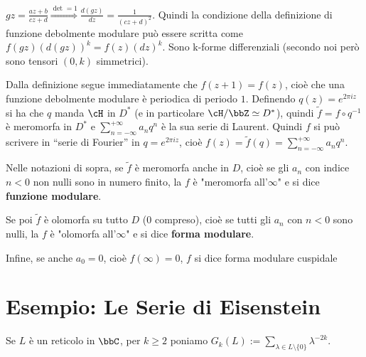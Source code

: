 \begin{osservazione}
$\displaystyle{gz=\frac{az+b}{cz+d} \stackrel{\det = 1}{\Rightarrow}
\frac{d(gz)}{dz}=\frac{1}{(cz+d)^2}}$. Quindi la condizione della definizione di
funzione debolmente modulare può essere scritta come $f(gz)(d(gz))^k=f(z)(dz)^k$.
Sono k-forme differenziali (secondo noi però sono tensori $(0, k)$ simmetrici).
\end{osservazione}

\begin{osservazione}
Dalla definizione segue immediatamente che $f(z+1)=f(z)$, cioè che una
funzione debolmente modulare è periodica di periodo $1$. Definendo $q(z) = e^{2 \pi i z}$
si ha che $q$ manda $\cH$ in $D^*$ (e in particolare $\cH / \bbZ \simeq D^*$), quindi
$\widetilde{f} = f \circ q^{-1}$ è meromorfa in $D^*$ e
$\displaystyle{\sum^{+\infty}_{n=-\infty}{a_n q^n}}$ è la sua serie di Laurent.
Quindi $f$ si può scrivere in ``serie di Fourier'' in $q=e^{2 \pi i z}$, cioè
$\displaystyle{f(z)=\widetilde{f}(q)=\sum^{+\infty}_{n=-\infty}{a_n q^n}}$.
\end{osservazione}

\begin{definizione}
Nelle notazioni di sopra, se $\widetilde{f}$ è meromorfa anche in $D$, cioè
se gli $a_n$ con indice $n<0$ non nulli sono in numero finito, la $f$
è "meromorfa all'$\infty$" e si dice {\bf funzione modulare}.

Se poi $\widetilde{f}$ è olomorfa su tutto $D$ ($0$ compreso), cioè se tutti gli $a_n$ con $n<0$
sono nulli, la $f$ è "olomorfa all'$\infty$" e si dice {\bf forma modulare}.

Infine, se anche $a_0=0$, cioè $f(\infty)=0$, $f$ si dice forma modulare
cuspidale
\end{definizione}

\section{Esempio: Le Serie di Eisenstein}

\begin{definizione}
Se $L$ è un reticolo in $\bbC$, per $k \geq 2$ poniamo
$G_k(L):=\displaystyle{\sum_{\lambda \in L \setminus \{ 0 \}}{\lambda ^{-2k}}}$.
\end{definizione}


